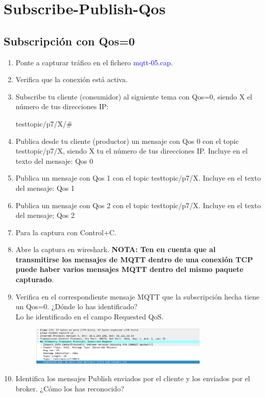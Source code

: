 \documentclass[12pt, a4paper]{report}
\begin{document}
\chapter{Subscribe-Publish-Qos}
\section{Subscripción con Qos=0}
\begin{enumerate}
	\item Ponte a capturar tráfico en el fichero \textcolor{blue}{mqtt-05.cap}.
	\item Verifica que la conexión está activa.
	\item Subscribe tu cliente (consumidor) al siguiente tema con Qos=0, siendo X el número de tus
	direcciones IP:
	\begin{center}
		testtopic/p7/X/\#
	\end{center}
	\item Publica desde tu cliente (productor) un mensaje con Qos 0 con el topic testtopic/p7/X, siendo
	X tu el número de tus direcciones IP. Incluye en el texto del mensaje: Qos 0
	\item Publica un mensaje con Qos 1 con el topic testtopic/p7/X. Incluye en el texto del mensaje:
	Qos 1
	\item Publica un mensaje con Qos 2 con el topic testtopic/p7/X. Incluye en el texto del mensaje;
	Qos 2
	\item Para la captura con Control+C.
	\item Abre la captura en wireshark. \textbf{NOTA: Ten en cuenta que al transmitirse los mensajes
		de MQTT dentro de una conexión TCP puede haber varios mensajes MQTT dentro
		del mismo paquete capturado}.
	\item Verifica en el correspondiente mensaje MQTT que la subscripción hecha tiene un Qos=0. ¿Dónde
	lo has identificado?\\
	
	Lo he identificado en el campo Requested QoS.
	\begin{figure}[H]
		\centering
		\includegraphics[width=0.8\textwidth]{ej8.1.9}
	\end{figure}
	\item Identifica los mensajes Publish enviados por el cliente y los enviados por el broker. ¿Cómo los
	has reconocido?\\
	

\end{enumerate}
\end{document}
